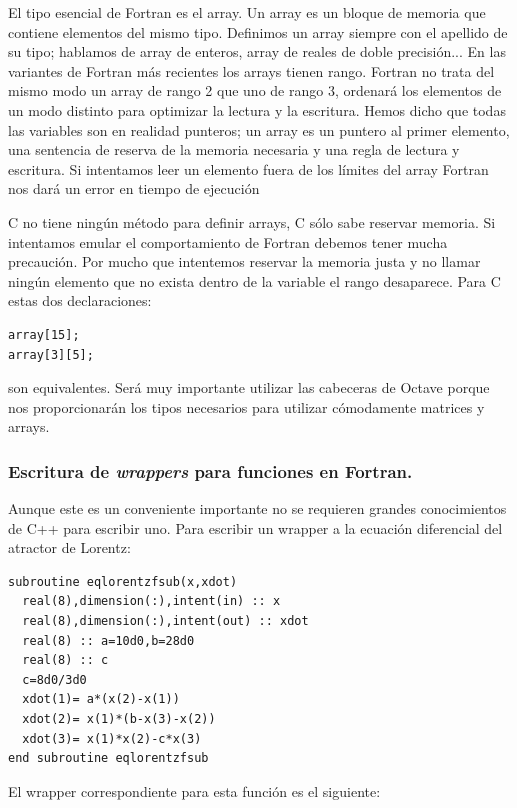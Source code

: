 El tipo esencial de Fortran es el array. Un array es un bloque de
memoria que contiene elementos del mismo tipo. Definimos un array
siempre con el apellido de su tipo; hablamos de array de enteros,
array de reales de doble precisión... En las variantes de Fortran más
recientes los arrays tienen rango. Fortran no trata del mismo modo un
array de rango 2 que uno de rango 3, ordenará los elementos de un modo
distinto para optimizar la lectura y la escritura. Hemos dicho que
todas las variables son en realidad punteros; un array es un puntero
al primer elemento, una sentencia de reserva de la memoria necesaria y
una regla de lectura y escritura. Si intentamos leer un elemento fuera
de los límites del array Fortran nos dará un error en tiempo de
ejecución

C no tiene ningún método para definir arrays, C sólo sabe reservar
memoria. Si intentamos emular el comportamiento de Fortran debemos
tener mucha precaución. Por mucho que intentemos reservar la memoria
justa y no llamar ningún elemento que no exista dentro de la variable
el rango desaparece. Para C estas dos declaraciones:

\begin{verbatim}
array[15];
array[3][5];
\end{verbatim}
son equivalentes. Será muy importante utilizar las cabeceras de Octave
porque nos proporcionarán los tipos necesarios para utilizar
cómodamente matrices y arrays.


\subsubsection{Escritura de \emph{wrappers} para funciones en
  Fortran.}

Aunque este es un conveniente importante no se requieren grandes
conocimientos de C++ para escribir uno. Para escribir un wrapper a la
ecuación diferencial del atractor de Lorentz:

\begin{verbatim}
subroutine eqlorentzfsub(x,xdot)
  real(8),dimension(:),intent(in) :: x
  real(8),dimension(:),intent(out) :: xdot
  real(8) :: a=10d0,b=28d0
  real(8) :: c
  c=8d0/3d0
  xdot(1)= a*(x(2)-x(1))
  xdot(2)= x(1)*(b-x(3)-x(2))
  xdot(3)= x(1)*x(2)-c*x(3)
end subroutine eqlorentzfsub
\end{verbatim}
El wrapper correspondiente para esta función es el siguiente:

